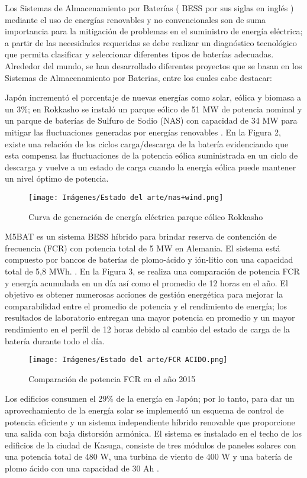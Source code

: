 Los Sistemas de Almacenamiento por Baterías  ( BESS por sus siglas en inglés ) mediante el uso de  energías renovables y no convencionales son de suma importancia  para la mitigación de problemas en el suministro de energía eléctrica; a partir de las necesidades requeridas se debe realizar un diagnóstico tecnológico que permita clasificar y seleccionar  diferentes tipos de baterías adecuadas. Alrededor del mundo, se han desarrollado diferentes proyectos que se basan en los Sistemas de Almacenamiento por Baterias, entre los cuales cabe destacar:

Japón incrementó el porcentaje de nuevas energías como solar, eólica y biomasa a un 3\%; en Rokkasho se instaló un parque eólico de 51 MW de potencia nominal y un parque de baterías de Sulfuro de Sodio (NAS) con capacidad de  34 MW para mitigar las fluctuaciones generadas por energías renovables \cite{parques_eolicos}. En la Figura 2, existe una relación de los ciclos  carga/descarga de la batería evidenciando que esta compensa las fluctuaciones de la potencia eólica suministrada en un ciclo de descarga y vuelve a un estado de carga cuando la energía eólica puede mantener un nivel óptimo de potencia.
\begin{figure}[h!]
    \begin{center}
    \centering
    \texttt{[image: Imágenes/Estado del arte/nas+wind.png]}
	\caption{ Curva de generación de energía eléctrica parque eólico Rokkasho \cite{bess_zarate}}
    \end{center}
\end{figure}
\newpage
M5BAT es un sistema BESS híbrido para brindar reserva de contención de frecuencia (FCR) con potencia total de 5 MW en Alemania. El sistema está compuesto por bancos de baterías de plomo-ácido y ión-litio con una capacidad total de 5,8 MWh. \cite{BESS_GERMANY}. En la Figura 3, se realiza una comparación de potencia FCR y energía acumulada en un día así como el promedio de 12 horas en el año. El objetivo es obtener numerosas acciones de gestión energética para mejorar la comparabilidad entre el promedio de potencia y el rendimiento de energía; los resultados de laboratorio entregan una mayor potencia en promedio y un mayor rendimiento en el perfil de 12 horas debido al cambio del estado de carga de la batería durante todo el día.
\begin{figure}[h!]
    \begin{center}
    \centering
    \texttt{[image: Imágenes/Estado del arte/FCR ACIDO.png]}
	\caption{ Comparación de potencia FCR en el año 2015 \cite{BESS_GERMANY}}
    \end{center}
\end{figure}
\newline
Los edificios consumen el 29\% de la energía en Japón; por lo tanto, para dar un aprovechamiento de la energía solar se implementó un esquema de control de potencia eficiente y un sistema independiente híbrido renovable que proporcione una salida con baja distorsión armónica. El sistema es instalado en el techo de los edificios de la ciudad de Kasuga, consiste de tres módulos de paneles solares con una potencia total de 480 W, una turbina de viento de 400 W y una batería de plomo ácido con una capacidad de 30 Ah \cite{BESS_KASUGA_JAPON}.

